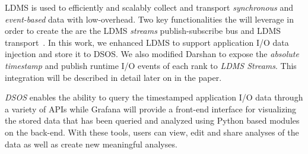 
LDMS is used to efficiently and scalably collect and transport \emph{synchronous} 
and \emph{event-based} data with low-overhead. Two key functionalities the \Darshan{} 
will leverage in order to create the \connector{} are the LDMS \emph{streams}
publish-subscribe bus and LDMS transport~\cite{ldmsgithub}. In this work, we 
enhanced LDMS to support application I/O data injection and store it to DSOS. 
We also modified Darshan to expose the \emph{absolute timestamp} and publish runtime I/O events of each rank to \emph{LDMS Streams}. This integration will be described in 
detail later on in the paper.   





\emph{DSOS} enables the ability to query the timestamped application I/O data through 
a variety of APIs while Grafana will provide a front-end interface for visualizing the 
stored data that has been queried and analyzed using Python based modules on the back-end. 
With these tools, users can view, edit and share analyses of the data as well as 
create new meaningful analyses. 

